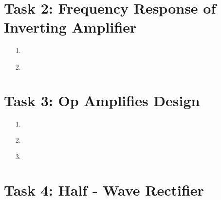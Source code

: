 \documentclass[11pt,a4paper]{article}
\begin{document}
\section*{Task 2: Frequency Response of Inverting Amplifier}

\begin{enumerate}
  \item[1.]
  
  \item[2.]
  
\end{enumerate}

\section*{Task 3: Op Amplifies Design}

\begin{enumerate}
  \item[1.]
  
  \item[2.]
  
  \item[3.]
  	
  
\end{enumerate}

\section*{Task 4: Half - Wave Rectifier}
\end{document}
